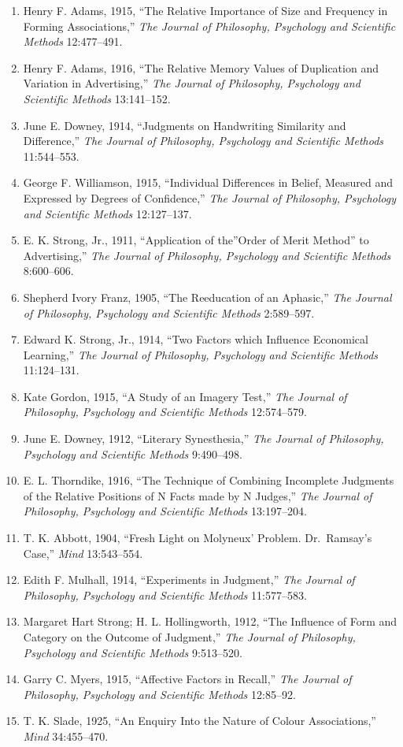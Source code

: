 \documentclass[
]{article}
\begin{document}
\begin{enumerate}
\def\labelenumi{\arabic{enumi}.}
\item
  Henry F. Adams, 1915, ``The Relative Importance of Size and Frequency
  in Forming Associations,'' \emph{The Journal of Philosophy, Psychology
  and Scientific Methods} 12:477--491.
\item
  Henry F. Adams, 1916, ``The Relative Memory Values of Duplication and
  Variation in Advertising,'' \emph{The Journal of Philosophy,
  Psychology and Scientific Methods} 13:141--152.
\item
  June E. Downey, 1914, ``Judgments on Handwriting Similarity and
  Difference,'' \emph{The Journal of Philosophy, Psychology and
  Scientific Methods} 11:544--553.
\item
  George F. Williamson, 1915, ``Individual Differences in Belief,
  Measured and Expressed by Degrees of Confidence,'' \emph{The Journal
  of Philosophy, Psychology and Scientific Methods} 12:127--137.
\item
  E. K. Strong, Jr., 1911, ``Application of the''Order of Merit Method''
  to Advertising,'' \emph{The Journal of Philosophy, Psychology and
  Scientific Methods} 8:600--606.
\item
  Shepherd Ivory Franz, 1905, ``The Reeducation of an Aphasic,''
  \emph{The Journal of Philosophy, Psychology and Scientific Methods}
  2:589--597.
\item
  Edward K. Strong, Jr., 1914, ``Two Factors which Influence Economical
  Learning,'' \emph{The Journal of Philosophy, Psychology and Scientific
  Methods} 11:124--131.
\item
  Kate Gordon, 1915, ``A Study of an Imagery Test,'' \emph{The Journal
  of Philosophy, Psychology and Scientific Methods} 12:574--579.
\item
  June E. Downey, 1912, ``Literary Synesthesia,'' \emph{The Journal of
  Philosophy, Psychology and Scientific Methods} 9:490--498.
\item
  E. L. Thorndike, 1916, ``The Technique of Combining Incomplete
  Judgments of the Relative Positions of N Facts made by N Judges,''
  \emph{The Journal of Philosophy, Psychology and Scientific Methods}
  13:197--204.
\item
  T. K. Abbott, 1904, ``Fresh Light on Molyneux' Problem. Dr.~Ramsay's
  Case,'' \emph{Mind} 13:543--554.
\item
  Edith F. Mulhall, 1914, ``Experiments in Judgment,'' \emph{The Journal
  of Philosophy, Psychology and Scientific Methods} 11:577--583.
\item
  Margaret Hart Strong; H. L. Hollingworth, 1912, ``The Influence of
  Form and Category on the Outcome of Judgment,'' \emph{The Journal of
  Philosophy, Psychology and Scientific Methods} 9:513--520.
\item
  Garry C. Myers, 1915, ``Affective Factors in Recall,'' \emph{The
  Journal of Philosophy, Psychology and Scientific Methods} 12:85--92.
\item
  T. K. Slade, 1925, ``An Enquiry Into the Nature of Colour
  Associations,'' \emph{Mind} 34:455--470.
\end{enumerate}
\end{document}
